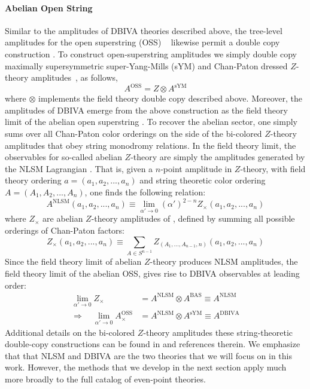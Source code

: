 \documentclass[11pt,letter]{article}
\begin{document}
\paragraph{Abelian Open String}
Similar to the amplitudes of DBIVA theories described above, the tree-level amplitudes for the open superstring (OSS) ~\cite{Mafra:2011nv,Mafra:2011nw} likewise permit a double copy construction \cite{Broedel:2013tta}. To construct open-superstring amplitudes we simply double copy maximally supersymmetric super-Yang-Mills (sYM) and Chan-Paton dressed $Z$-theory amplitudes~\cite{Carrasco:2016ldy,Carrasco:2016ygv,Mafra:2016mcc}, as follows,
\begin{equation}
A^{\text{OSS}}= Z \otimes A^{ \text{sYM}}
\end{equation}
where $\otimes$ implements the field theory double copy \cite{KLT, BCJ} described above. Moreover, the amplitudes of DBIVA emerge from the above construction as the field theory limit of the {abelian open superstring} \cite{Green:1982sw}. To recover the abelian sector, one simply sums over all Chan-Paton color orderings on the side of the bi-colored $Z$-theory amplitudes that obey string monodromy relations. In the field theory limit, the observables for so-called {abelian} $Z$-theory are simply the amplitudes generated by the NLSM Lagrangian \cite{Carrasco:2016ldy}. That is, given a $n$-point amplitude in $Z$-theory, with field theory ordering $a=(a_1,a_2,...,a_n)$ and string theoretic color ordering $A=(A_1,A_2,...,A_n)$, one finds the following relation:
\begin{equation}
A^{\text{NLSM}}{(a_1,a_2,...,a_n)} \equiv \lim_{\alpha' \to 0} (\alpha')^{2-n}  Z_{\times}{(a_1,a_2,...,a_n)}
\end{equation}
where $Z_{\times}$ are abelian $Z$-theory amplitudes of \cite{Carrasco:2016ldy}, defined by summing all possible orderings of Chan-Paton factors:
\begin{equation}
Z_{\times}(a_1,a_2,...,a_n)\equiv \sum_{A \in S^{n-1}} Z_{(A_1,...,A_{n-1},n)}{(a_1,a_2,...,a_n)}
\end{equation}
Since the field theory limit of abelian $Z$-theory produces NLSM amplitudes, the field theory limit of the abelian OSS, gives rise to DBIVA observables at leading order:
\begin{equation}
\begin{aligned} 
\lim_{\alpha' \to 0 }Z_{\times}&= A^{\text{NLSM}} \otimes A^{\text{BAS}}\equiv A^{\text{NLSM}}
\\
\Rightarrow \quad\lim_{\alpha' \to 0 }A^{\text{OSS}}_{\times}&= A^{\text{NLSM}} \otimes A^{ \text{sYM}}\equiv A^{\text{DBIVA}}
\end{aligned}
\end{equation}
Additional details on the bi-colored $Z$-theory amplitudes these string-theoretic double-copy constructions can be found in \cite{Broedel:2013tta,Carrasco:2016ldy,Carrasco:2016ygv,Mafra:2016mcc,Azevedo:2018dgo} and references therein. We emphasize that that NLSM and DBIVA are the two theories that we will focus on in this work. However, the methods that we develop in the next section apply much more broadly to the full catalog of even-point theories.  
\end{document}
